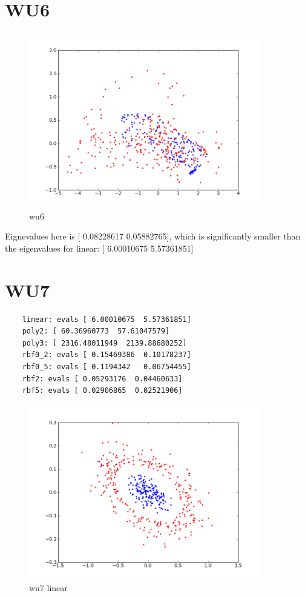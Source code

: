 \section*{WU6}
\begin{figure}[here]
	\center
	\caption{wu6}
	\label{fig:wu6}
	\includegraphics[width=4.0in]{img/wu6.png}
\end{figure}

Eignevalues here is [ 0.08228617  0.05882765], which is significantly smaller than
the eigenvalues for 
linear: [ 6.00010675  5.57361851]

\section*{WU7}
\begin{verbatim}
	linear: evals [ 6.00010675  5.57361851]
	poly2: [ 60.36960773  57.61047579]
	poly3: [ 2316.48011949  2139.88680252]
	rbf0_2: evals [ 0.15469386  0.10178237]
	rbf0_5: evals [ 0.1194342   0.06754455]
	rbf2: evals [ 0.05293176  0.04460633]
	rbf5: evals [ 0.02906865  0.02521906]
\end{verbatim}

\begin{figure}[here]
	\center
	\caption{wu7 linear}
	\label{fig:wu7_linear}
	\includegraphics[width=4.0in]{img/wu7_linear.png}
\end{figure}


